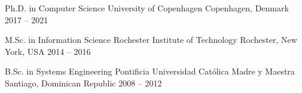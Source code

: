 
\begin{cventries}

  \cventry
    {Ph.D. in Computer Science}
    {University of Copenhagen}
    {Copenhagen, Denmark}
    {2017 -- 2021}
    {
    }


  \cventry
    {M.Sc. in Information Science}
    {Rochester Institute of Technology}
    {Rochester, New York, USA}
    {2014 -- 2016}
    {
    }

  \cventry
    {B.Sc. in Systems Engineering}
    {Pontificia Universidad Cat\'olica Madre y Maestra}
    {Santiago, Dominican Republic}
    {2008 -- 2012}
    {
    }

\end{cventries}
